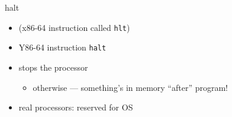 \begin{frame}[fragile,label=hlt]{halt}
    \begin{itemize}
    \item (x86-64 instruction called {\tt hlt})
    \item Y86-64 instruction {\tt halt}
    \item stops the processor
        \begin{itemize}
        \item otherwise --- something's in memory ``after'' program!
        \end{itemize}
    \item real processors: reserved for OS
    \end{itemize}
\end{frame}

